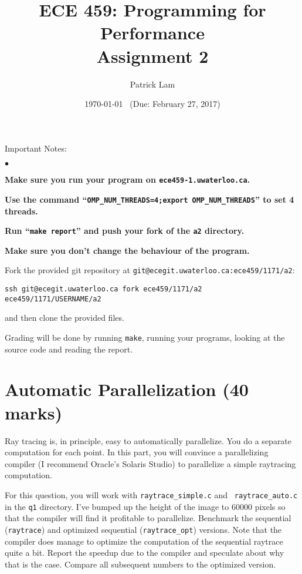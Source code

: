 \documentclass[letterpaper,10pt]{article}
\title{\bf ECE 459: Programming for Performance\\Assignment 2}
\author{Patrick Lam}
\date{\today ~ (Due: February 27, 2017)}
\begin{document}
\maketitle
\newcommand{\squishlist}{
 \begin{list}{$\bullet$}
  { \setlength{\itemsep}{0pt}
     \setlength{\parsep}{3pt}
     \setlength{\topsep}{3pt}
     \setlength{\partopsep}{0pt}
     \setlength{\leftmargin}{1.5em}
     \setlength{\labelwidth}{1em}
     \setlength{\labelsep}{0.5em} } }
\newcommand{\squishend}{
  \end{list}  }

\noindent
Important Notes:

\squishlist
  \item {\bf Make sure you run your program on {\tt ece459-1.uwaterloo.ca}.}
  \item {\bf Use the command ``{\tt OMP\_NUM\_THREADS=4;export OMP\_NUM\_THREADS}'' to set 4 threads.}
  \item {\bf Run ``{\tt make report}'' and push your fork of the {\tt a2} directory.}
  \item {\bf Make sure you don't change the behaviour of the program.}
\squishend

\noindent
Fork the provided git repository at {\tt git@ecegit.uwaterloo.ca:ece459/1171/a2}:
\begin{center}
{\tt ssh git@ecegit.uwaterloo.ca fork ece459/1171/a2 ece459/1171/USERNAME/a2}
\end{center}
\noindent and then clone the provided files.

Grading will be done by running {\tt make}, running your programs,
looking at the source code and reading the report.

\section*{Automatic Parallelization (40 marks)}
Ray tracing is, in principle, easy to automatically parallelize. You do
a separate computation for each point. In this part, you will convince a
parallelizing compiler (I recommend Oracle's Solaris Studio) to parallelize
a simple raytracing computation.

For this question, you will work with {\tt raytrace\_simple.c} and {\tt
  raytrace\_auto.c} in the {\tt q1} directory.  I've bumped up the
height of the image to 60000 pixels so that the compiler will find it
profitable to parallelize. Benchmark the sequential ({\tt raytrace})
and optimized sequential ({\tt raytrace\_opt}) versions. Note that the
compiler does manage to optimize the computation of the sequential
raytrace quite a bit. Report the speedup due to the compiler and
speculate about why that is the case. Compare all subsequent numbers
to the optimized version.
\end{document}
